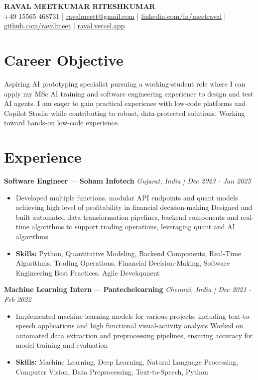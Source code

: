 \documentclass[a4paper,10pt]{article}
\begin{document}
\begin{center}
  {\Large\bfseries RAVAL MEETKUMAR RITESHKUMAR}\\[2pt]
  {\small +49 15565 468731 \;|\; \href{mailto:ravalmeett@gmail.com}{ravalmeett@gmail.com} \;|\; \href{https://www.linkedin.com/in/meetraval/}{linkedin.com/in/meetraval} \;|\; \href{https://github.com/ravalmeet}{github.com/ravalmeet} \;|\; \href{https://raval.vercel.app/}{raval.vercel.app}}
\end{center}
\vspace{-3pt}

\section*{Career Objective}
Aspiring AI prototyping specialist pursuing a working-student role where I can apply my MSc AI training and software engineering experience to design and test AI agents. I am eager to gain practical experience with low-code platforms and Copilot Studio while contributing to robust, data-protected solutions. Working toward hands-on low-code experience.\par

\section*{Experience}
\textbf{Software Engineer} — \textbf{Soham Infotech} \hfill \textit{Gujarat, India \;|\; Dec 2023 - Jan 2025}\par
\vspace{1pt}
\begin{itemize}
  \item Developed multiple functions, modular API endpoints and quant models achieving high level of profitability in financial decision-making Designed and built automated data transformation pipelines, backend components and real-time algorithms to support trading operations, leveraging quant and AI algorithms
  \item \textbf{Skills:} Python, Quantitative Modeling, Backend Components, Real-Time Algorithms, Trading Operations, Financial Decision-Making, Software Engineering Best Practices, Agile Development
\end{itemize}
\vspace{3pt}
\textbf{Machine Learning Intern} — \textbf{Pantechelearning} \hfill \textit{Chennai, India \;|\; Dec 2021 - Feb 2022}\par
\vspace{1pt}
\begin{itemize}
  \item Implemented machine learning models for various projects, including text-to-speech applications and high functional visual-activity analysis Worked on automated data extraction and preprocessing pipelines, ensuring accuracy for model training and evaluation
  \item \textbf{Skills:} Machine Learning, Deep Learning, Natural Language Processing, Computer Vision, Data Preprocessing, Text-to-Speech, Python
\end{itemize}
\end{document}
